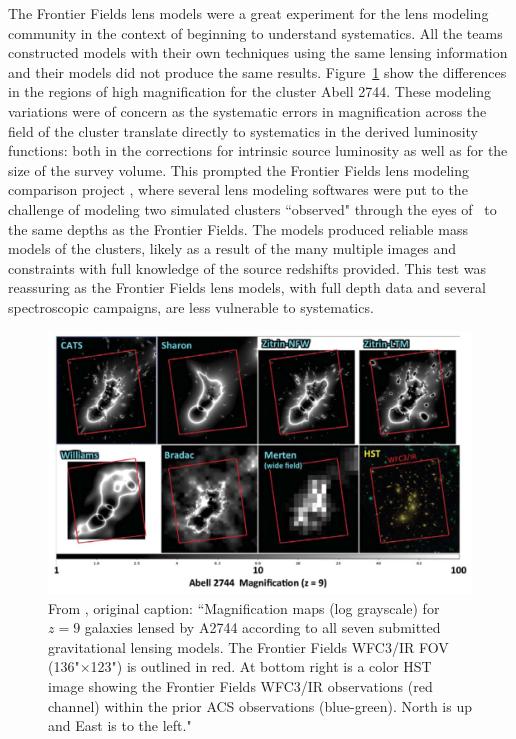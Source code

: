 The Frontier Fields lens models were a great experiment for the lens modeling community in the context of beginning to understand systematics. All the teams constructed models with their own techniques using the same lensing information and their models did not produce the same results. Figure~\ref{intro:fig:hff_models} show the differences in the regions of high magnification for the cluster Abell 2744. These modeling variations were of concern as the systematic errors in magnification across the field of the cluster translate directly to systematics in the derived luminosity functions: both in the corrections for intrinsic source luminosity as well as for the size of the survey volume. This prompted the Frontier Fields lens modeling comparison project \citep{Meneghetti:2016xe}, where several lens modeling softwares were put to the challenge of modeling two simulated clusters ``observed" through the eyes of \hst\ to the same depths as the Frontier Fields. The models produced reliable mass models of the clusters, likely as a result of the many multiple images and constraints with full knowledge of the source redshifts provided. This test was reassuring as the Frontier Fields lens models, with full depth data and several spectroscopic campaigns, are less vulnerable to systematics.

\begin{figure}
\includegraphics[width=\textwidth]{Intro/hff_models.png}
\caption[Magnification maps of Abell~2744 produced by Frontier Fields lens modeling teams]{From \citet{Coe:2015qf}, original caption: ``Magnification maps (log grayscale) for $z=9$ galaxies lensed by A2744 according to all seven submitted gravitational lensing models. The Frontier Fields WFC3/IR FOV (136"$\times$123") is outlined in red. At bottom right is a color HST image \citep[produced with Trilogy; ][]{Coe:2012px} showing the Frontier Fields WFC3/IR observations (red channel) within the prior ACS observations (blue-green). North is up and East is to the left."}
\label{intro:fig:hff_models}
\end{figure}


